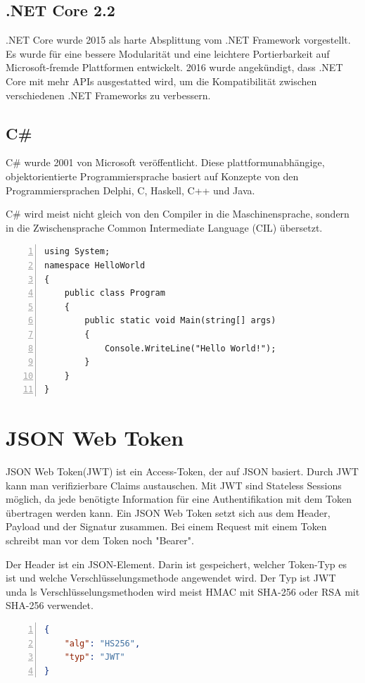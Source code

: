 \subsection{.NET Core 2.2}
.NET Core wurde 2015 als harte Absplittung vom .NET Framework vorgestellt. Es wurde für eine bessere Modularität und eine leichtere Portierbarkeit auf Microsoft-fremde Plattformen entwickelt. 2016 wurde angekündigt, dass .NET Core mit mehr APIs ausgestatted wird, um die Kompatibilität zwischen verschiedenen .NET Frameworks zu verbessern. \autocite{wikiDotnet}

\subsection{C\#}
C\# wurde 2001 von Microsoft veröffentlicht. Diese plattformunabhängige, objektorientierte Programmiersprache basiert auf Konzepte von den Programmiersprachen Delphi, C, Haskell, C++ und Java.

C\# wird meist nicht gleich von den Compiler in die Maschinensprache, sondern in die Zwischensprache Common Intermediate Language (CIL) übersetzt. \autocite{wikiCSharp}

\begin{lstlisting}[caption={C\#-Syntaxbeispiel},captionpos=b, numbers=left, backgroundcolor=\color{black!10}, language={[Sharp]C}]
using System;
namespace HelloWorld
{
	public class Program
	{
		public static void Main(string[] args)
		{
			Console.WriteLine("Hello World!");
		}
	}
}
\end{lstlisting}

\section{JSON Web Token}
JSON Web Token(JWT) ist ein Access-Token, der auf JSON basiert. Durch JWT kann man verifizierbare Claims austauschen. Mit JWT sind Stateless Sessions möglich, da jede benötigte Information für eine Authentifikation mit dem Token übertragen werden kann. Ein JSON Web Token setzt sich aus dem Header, Payload und der Signatur zusammen. Bei einem Request mit einem Token schreibt man vor dem Token noch "Bearer".

Der Header ist ein JSON-Element. Darin ist gespeichert, welcher Token-Typ es ist und welche Verschlüsselungsmethode angewendet wird. Der Typ ist JWT unda ls Verschlüsselungsmethoden wird meist HMAC mit SHA-256 oder RSA mit SHA-256 verwendet.\\
\begin{lstlisting}[caption={JWT-Header Beispiel},captionpos=b, numbers=left, backgroundcolor=\color{black!10}, language=json]
{
	"alg": "HS256",
	"typ": "JWT"
}
\end{lstlisting}

